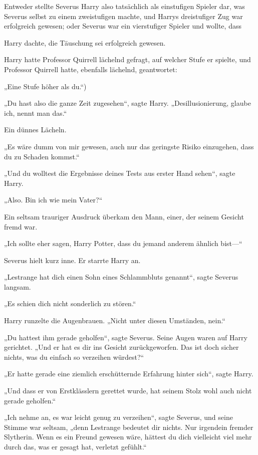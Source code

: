 {Entweder stellte Severus Harry also tatsächlich als einstufigen Spieler dar, was Severus selbst zu einem zweistufigen machte, und Harrys dreistufiger Zug war erfolgreich gewesen; oder Severus war ein vierstufiger Spieler und wollte, dass

Harry dachte, die Täuschung sei erfolgreich gewesen.

Harry hatte Professor Quirrell lächelnd gefragt, auf welcher Stufe er spielte, und Professor Quirrell hatte, ebenfalls lächelnd, geantwortet:

„Eine Stufe höher als du.“)

„Du hast also die ganze Zeit zugesehen“, sagte Harry. „Desillusionierung, glaube ich, nennt man das.“

Ein dünnes Lächeln.

„Es wäre dumm von mir gewesen, auch nur das geringste Risiko einzugehen, dass du zu Schaden kommst.“

„Und du wolltest die Ergebnisse deines Tests aus erster Hand sehen“, sagte Harry.

„Also. Bin ich wie mein Vater?“

Ein seltsam trauriger Ausdruck überkam den Mann, einer, der seinem Gesicht fremd war.

„Ich sollte eher sagen, Harry Potter, dass du jemand anderem ähnlich bist—“

Severus hielt kurz inne. Er starrte Harry an.

„Lestrange hat dich einen Sohn eines Schlammbluts genannt“, sagte Severus langsam.

„Es schien dich nicht sonderlich zu stören.“

Harry runzelte die Augenbrauen. „Nicht unter diesen Umständen, nein.“

„Du hattest ihm gerade geholfen“, sagte Severus. Seine Augen waren auf Harry gerichtet. „Und er hat es dir ins Gesicht zurückgeworfen. Das ist doch sicher nichts, was du einfach so verzeihen würdest?“

„Er hatte gerade eine ziemlich erschütternde Erfahrung hinter sich“, sagte Harry.

„Und dass er von Erstklässlern gerettet wurde, hat seinem Stolz wohl auch nicht gerade geholfen.“

„Ich nehme an, es war leicht genug zu verzeihen“, sagte Severus, und seine Stimme war seltsam, „denn Lestrange bedeutet dir nichts. Nur irgendein fremder Slytherin. Wenn es ein Freund gewesen wäre, hättest du dich vielleicht viel mehr durch das, was er gesagt hat, verletzt gefühlt.“

}
